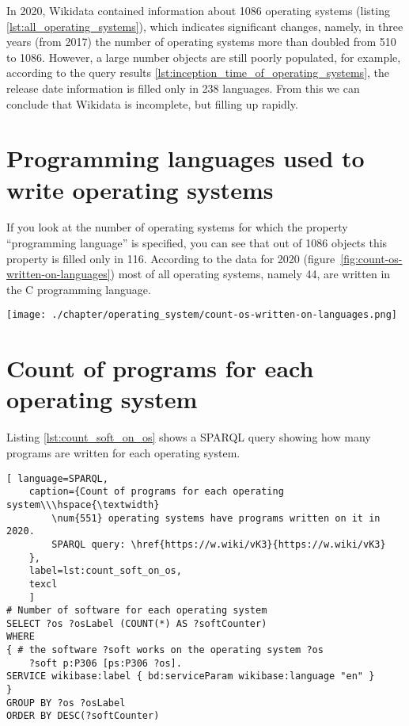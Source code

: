 In 2020, Wikidata contained information about 1086 operating systems (listing \ref{lst:all_operating_systems}), which indicates significant changes, namely, in three years (from 2017) the number of operating systems more than doubled from 510 to 1086. However, a large number objects are still poorly populated, for example, according to the query results \ref{lst:inception_time_of_operating_systems}, the release date information is filled only in \num{238} languages. From this we can conclude that Wikidata is incomplete, but filling up rapidly.

\section{Programming languages used to write operating systems}
If you look at the number of operating systems for which the property ``programming language'' is specified, you can see that out of \num{1086} objects this property is filled only in \num{116}. According to the data for 2020 (figure~\ref{fig:count-os-written-on-languages}) most of all operating systems, namely \num{44}, are written in the C programming language.

\begin{figure*}[h!]
	\texttt{[image: ./chapter/operating\_system/count-os-written-on-languages.png]}
	\caption{The first eight languages in which the most operating systems are written, 2020.}
	\label{fig:count-os-written-on-languages}
\end{figure*}

\section{Count of programs for each operating system}
Listing \ref{lst:count_soft_on_os} shows a SPARQL query showing how many programs are written for each operating system.

\begin{lstlisting}[ language=SPARQL, 
	caption={Count of programs for each operating system\\\hspace{\textwidth}
		\num{551} operating systems have programs written on it in 2020.
		SPARQL query: \href{https://w.wiki/vK3}{https://w.wiki/vK3}
	},
	label=lst:count_soft_on_os,
	texcl 
	]
# Number of software for each operating system
SELECT ?os ?osLabel (COUNT(*) AS ?softCounter)
WHERE
{ # the software ?soft works on the operating system ?os
	?soft p:P306 [ps:P306 ?os].
SERVICE wikibase:label { bd:serviceParam wikibase:language "en" }
}
GROUP BY ?os ?osLabel
ORDER BY DESC(?softCounter)
\end{lstlisting}

